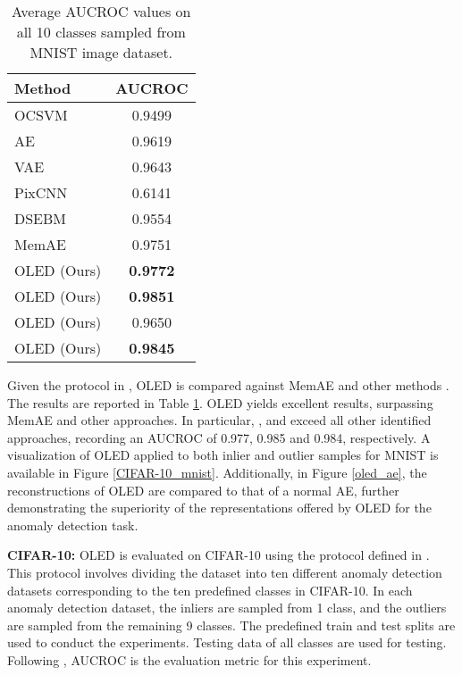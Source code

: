 \documentclass[10pt,twocolumn,letterpaper]{article}
\begin{document}
\begin{table}
\begin{center}
 \begin{tabular}{|l|c|} 
 \hline
Method & AUCROC \\ [0.5ex] 
 \hline\hline
 OCSVM \cite{scholkopf2002learning} & 0.9499  \\ 
 
 AE \cite{bengio2007greedy} & 0.9619 \\

 VAE \cite{kingma2013auto} & 0.9643  \\

 PixCNN  \cite{oord2016conditional} & 0.6141  \\

 DSEBM \cite{zhai2016deep} & 0.9554 \\ 
 
 MemAE \cite{gong2019memorizing} & 0.9751 \\

 \hline
 OLED (Ours)   & \textbf{0.9772}  \\ 
 OLED (Ours)   & \textbf{0.9851} \\
 OLED (Ours)   & 0.9650 \\
 OLED (Ours)   &  \textbf{0.9845} \\
 \hline
\end{tabular}
\end{center}
\caption{Average AUCROC values on all 10 classes sampled from MNIST image dataset.}
\label{mnist_exp}
\end{table}


Given the protocol in \cite{gong2019memorizing}, OLED is compared against MemAE \cite{gong2019memorizing} and other methods \cite{scholkopf2002learning, kingma2013auto, oord2016conditional, zhai2016deep}. The results are reported in Table \ref{mnist_exp}. OLED yields excellent results, surpassing MemAE and other approaches. In particular,  ,  and  exceed all other identified approaches, recording an AUCROC of 0.977, 0.985 and 0.984, respectively. A visualization of OLED applied to both inlier and outlier samples for MNIST is available in Figure \ref{CIFAR-10_mnist}. Additionally, in Figure \ref{oled_ae}, the reconstructions of OLED are compared to that of a normal AE, further demonstrating the superiority of the representations offered by OLED for the anomaly detection task. 

{\bf CIFAR-10:} OLED is evaluated on CIFAR-10 using the protocol defined in \cite{perera2019ocgan}. This protocol involves dividing the dataset into ten different anomaly detection datasets corresponding to the ten predefined classes in CIFAR-10. In each anomaly detection dataset, the inliers are sampled from 1 class, and the outliers are sampled from the remaining 9 classes. The predefined train and test splits are used to conduct the experiments. Testing data of all classes are used for testing. Following \cite{perera2019ocgan}, AUCROC is the evaluation metric for this experiment. 
\end{document}
